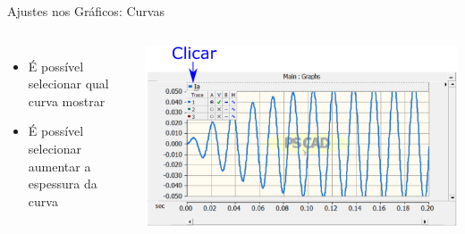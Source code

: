 



\begin{frame}{Ajustes nos Gráficos: Curvas}
\centering

\begin{columns}

\begin{itemize}
\item É possível selecionar qual curva mostrar
\vspace*{2cm}
\item É possível selecionar aumentar a espessura da curva
\end{itemize}


\centering
\includegraphics[width=0.9\linewidth]{./figuras/Visualizacao-resultados/graficos-Selecao}

\end{columns}

\end{frame}





